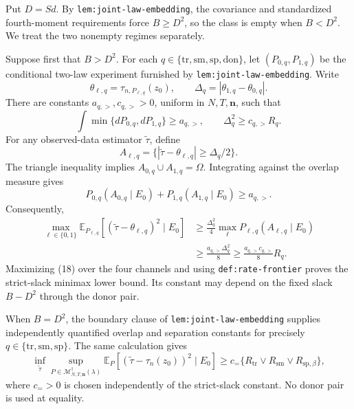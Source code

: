 Put \(D=Sd\).  By \texttt{lem:joint-law-embedding}, the covariance and standardized fourth-moment requirements force \(B\geq D^2\), so the class is empty when \(B<D^2\).  We treat the two nonempty regimes separately.

Suppose first that \(B>D^2\).  For each
\(q\in\{\mathrm{tr},\mathrm{sm},\mathrm{sp},\mathrm{don}\}\), let
\((P_{0,q},P_{1,q})\) be the conditional two-law experiment furnished by \texttt{lem:joint-law-embedding}.  Write
\[
\theta_{\ell,q}=\tau_{n,P_{\ell,q}}(z_0),
\qquad
\Delta_q=|\theta_{1,q}-\theta_{0,q}|.
\]
There are constants \(a_{q,>},c_{q,>}>0\), uniform in \(N,T,\mathbf n\), such that
\[
\int\min\{dP_{0,q},dP_{1,q}\}\geq a_{q,>},
\qquad
\Delta_q^2\geq c_{q,>}R_q.
\tag{16}
\]
For any observed-data estimator \(\widetilde\tau\), define
\[
A_{\ell,q}=\{|\widetilde\tau-\theta_{\ell,q}|\geq\Delta_q/2\}.
\]
The triangle inequality implies \(A_{0,q}\cup A_{1,q}=\Omega\).  Integrating against the overlap measure gives
\[
P_{0,q}(A_{0,q}\mid E_0)+P_{1,q}(A_{1,q}\mid E_0)
\geq a_{q,>}.
\tag{17}
\]
Consequently,
\[
\begin{aligned}
\max_{\ell\in\{0,1\}}
\mathbb E_{P_{\ell,q}}[(\widetilde\tau-\theta_{\ell,q})^2\mid E_0]
&\geq\frac{\Delta_q^2}{4}
\max_\ell P_{\ell,q}(A_{\ell,q}\mid E_0)\\
&\geq\frac{a_{q,>}\Delta_q^2}{8}
\geq\frac{a_{q,>}c_{q,>}}8R_q.
\end{aligned}
\tag{18}
\]
Maximizing (18) over the four channels and using \texttt{def:rate-frontier} proves the strict-slack minimax lower bound.  Its constant may depend on the fixed slack \(B-D^2\) through the donor pair.

When \(B=D^2\), the boundary clause of \texttt{lem:joint-law-embedding} supplies independently quantified overlap and separation constants for precisely
\(q\in\{\mathrm{tr},\mathrm{sm},\mathrm{sp}\}\).  The same calculation gives
\[
\inf_{\widetilde\tau}\sup_{P\in\mathcal M_{N,T,\mathbf n}^{\dagger}(\lambda)}
\mathbb E_P[(\widetilde\tau-\tau_n(z_0))^2\mid E_0]
\geq c_{=}
\{R_{\mathrm{tr}}\vee R_{\mathrm{sm}}\vee R_{\mathrm{sp},\beta}\},
\tag{19}
\]
where \(c_{=}>0\) is chosen independently of the strict-slack constant.  No donor pair is used at equality.

